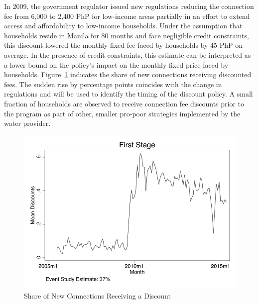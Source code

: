 \documentclass[12pt]{article}
\begin{document}
\begin{appendices}

In 2009, the government regulator issued new regulations reducing the connection fee from 6,000 to 2,400 PhP for low-income areas partially in an effort to extend access and affordability to low-income households.  Under the assumption that households reside in Manila for 80 months and face negligible credit constraints, this discount lowered the monthly fixed fee faced by households by 45 PhP on average.  In the presence of credit constraints, this estimate can be interpreted as a lower bound on the policy's impact on the monthly fixed price faced by households.  Figure~\ref{figure:discountfirststage} indicates the share of new connections receiving discounted fees.  The sudden rise by percentage points coincides with the change in regulations and will be used to identify the timing of the discount policy.  A small fraction of households are observed to receive connection fee discounts prior to the program as part of other, smaller pro-poor strategies implemented by the water provider.

\begin{figure}
\centering
\caption{Share of New Connections Receiving a Discount}\label{figure:discountfirststage}
\includegraphics[scale=.7]{tables/diff_595_first_stage.pdf}
\end{figure}


\end{appendices}
\end{document}
